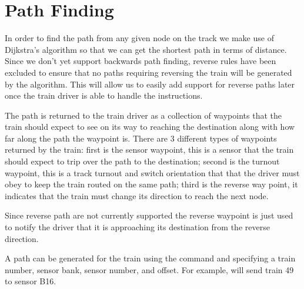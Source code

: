 \documentclass[pdftex,10pt,a4paper]{article}
\begin{document}
\section*{Path Finding}

In order to find the path from any given node on the track we make use of
Dijkstra's algorithm so that we can get the shortest path in terms of distance.
Since we don't yet support backwards path finding, reverse rules have
been excluded to ensure that no paths requiring reversing the train
will be generated by the algorithm. This will allow us to easily add
support for reverse paths later once the train driver is able to
handle the instructions.

The path is returned to the train driver as a collection of waypoints that the
train should expect to see on its way to reaching the destination along with
how far along the path the waypoint is. There are 3 different types of
waypoints returned by the train: first is the sensor waypoint, this is a sensor
that the train should expect to trip over the path to the destination; second
is the turnout waypoint, this is a track turnout and switch orientation that
that the driver must obey to keep the train routed on the same path; third is
the reverse way point, it indicates that the train must change its direction to
reach the next node.

Since reverse path are not currently supported the reverse waypoint is just used
to notify the driver that it is approaching its destination from the reverse
direction.

A path can be generated for the train using the  command and
specifying a train number, sensor bank, sensor number, and offset. For
example,  will send train 49 to sensor B16.
\end{document}
